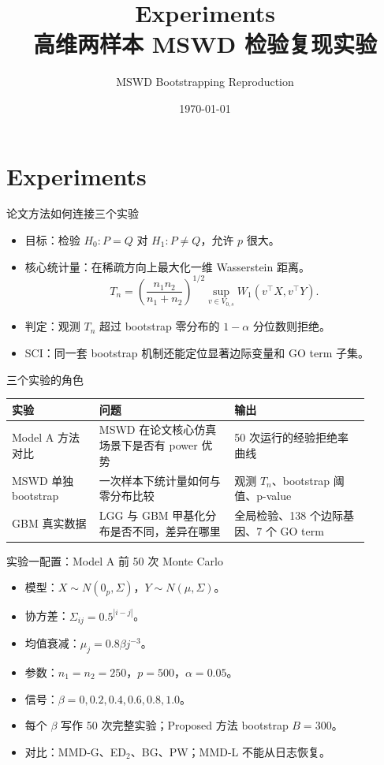\documentclass[UTF8,aspectratio=169,11pt]{ctexbeamer}
\title[Experiments]{Experiments\\高维两样本 MSWD 检验复现实验}
\author{MSWD Bootstrapping Reproduction}
\date{\today}
\begin{document}
\section{Experiments}

\begin{frame}[plain]
  \titlepage
\end{frame}

\begin{frame}{论文方法如何连接三个实验}
\begin{itemize}
  \item 目标：检验 \(H_0:P=Q\) 对 \(H_1:P\neq Q\)，允许 \(p\) 很大。
  \item 核心统计量：在稀疏方向上最大化一维 Wasserstein 距离。
  \[
  T_n=\left(\frac{n_1n_2}{n_1+n_2}\right)^{1/2}
  \sup_{v\in V_{0,s}} W_1(v^\top X,v^\top Y).
  \]
  \item 判定：观测 \(T_n\) 超过 bootstrap 零分布的 \(1-\alpha\) 分位数则拒绝。
  \item SCI：同一套 bootstrap 机制还能定位显著边际变量和 GO term 子集。
\end{itemize}
\end{frame}

\begin{frame}{三个实验的角色}
\begin{tabular}{p{0.22\linewidth}p{0.34\linewidth}p{0.34\linewidth}}
\toprule
实验 & 问题 & 输出 \\
\midrule
Model A 方法对比 & MSWD 在论文核心仿真场景下是否有 power 优势 & 50 次运行的经验拒绝率曲线 \\
MSWD 单独 bootstrap & 一次样本下统计量如何与零分布比较 & 观测 \(T_n\)、bootstrap 阈值、p-value \\
GBM 真实数据 & LGG 与 GBM 甲基化分布是否不同，差异在哪里 & 全局检验、138 个边际基因、7 个 GO term \\
\bottomrule
\end{tabular}
\end{frame}

\begin{frame}{实验一配置：Model A 前 50 次 Monte Carlo}
\begin{itemize}
  \item 模型：\(X\sim N(0_p,\Sigma)\)，\(Y\sim N(\mu,\Sigma)\)。
  \item 协方差：\(\Sigma_{ij}=0.5^{|i-j|}\)。
  \item 均值衰减：\(\mu_j=0.8\beta j^{-3}\)。
  \item 参数：\(n_1=n_2=250\)，\(p=500\)，\(\alpha=0.05\)。
  \item 信号：\(\beta=0,0.2,0.4,0.6,0.8,1.0\)。
  \item 每个 \(\beta\) 写作 50 次完整实验；Proposed 方法 bootstrap \(B=300\)。
  \item 对比：MMD-G、ED$_2$、BG、PW；MMD-L 不能从日志恢复。
\end{itemize}
\end{frame}
\end{document}

